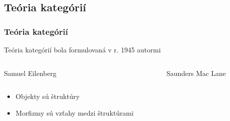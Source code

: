 \subsection{Teória kategórií}

\frame
{
  \frametitle{Teória kategórií}

  \begin{block}{Teória kategórií bola formulovaná v r. 1945 autormi}
  	\begin{center}
	\begin{columns}
		\begin{column}{0.23\textwidth}
			\alert{Samuel} \vspace{0.1cm} \alert{Eilenberg}
		\end{column}
		\begin{column}{0.25\textwidth}
		\end{column}
		\begin{column}{0.25\textwidth}
		\end{column}
		\begin{column}{0.17\textwidth}
			\alert{Saunders} \vspace{0.1cm} \alert{Mac Lane}
		\end{column}
	\end{columns}
\vspace{-0.27cm}

		\end{center}

\begin{itemize}
		\item Objekty sú štruktúry
		\item Morfizmy sú vzťahy medzi štruktúrami
	\end{itemize}

  	\end{block}
}

